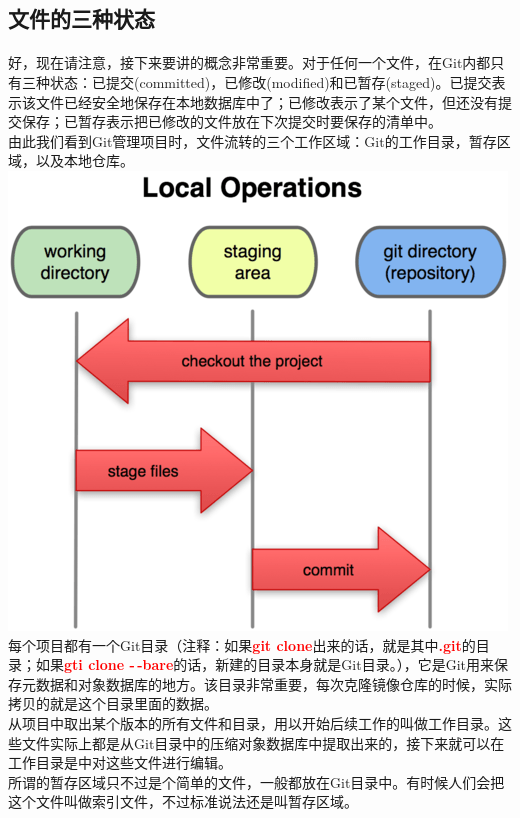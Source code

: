 \documentclass{book}
\begin{document}
	\subsection{文件的三种状态}
	\paragraph{}
	好，现在请注意，接下来要讲的概念非常重要。对于任何一个文件，在Git内都只有三种状态：已提交(committed)，已修改(modified)和已暂存(staged)。已提交表示该文件已经安全地保存在本地数据库中了；已修改表示了某个文件，但还没有提交保存；已暂存表示把已修改的文件放在下次提交时要保存的清单中。\\
	由此我们看到Git管理项目时，文件流转的三个工作区域：Git的工作目录，暂存区域，以及本地仓库。\\
	\includegraphics{1-6.png}\\
	每个项目都有一个Git目录（注释：如果\textcolor{red}{\textbf{git clone}}出来的话，就是其中\textcolor{red}{\textbf{.git}}的目录；如果\textcolor{red}{\textbf{gti clone -\,-bare}}的话，新建的目录本身就是Git目录。），它是Git用来保存元数据和对象数据库的地方。该目录非常重要，每次克隆镜像仓库的时候，实际拷贝的就是这个目录里面的数据。\\
	从项目中取出某个版本的所有文件和目录，用以开始后续工作的叫做工作目录。这些文件实际上都是从Git目录中的压缩对象数据库中提取出来的，接下来就可以在工作目录是中对这些文件进行编辑。\\
	所谓的暂存区域只不过是个简单的文件，一般都放在Git目录中。有时候人们会把这个文件叫做索引文件，不过标准说法还是叫暂存区域。\\
\end{document}
